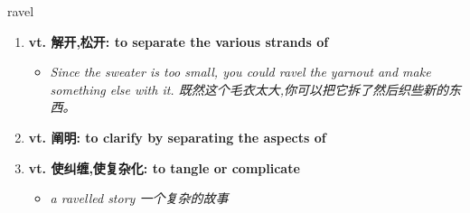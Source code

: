 
\begin{frame}
{\huge ravel}
\begin{center}
\begin{enumerate}\Large
  \item \textbf{vt. 解开,松开: to separate the various strands of}
  \begin{itemize}
    \item \em{\Large{Since the sweater is too small, you could ravel the yarnout and make something else with it. 既然这个毛衣太大,你可以把它拆了然后织些新的东西。}}
  \end{itemize}
  \item \textbf{vt. 阐明: to clarify by separating the aspects of}
  \item \textbf{vt. 使纠缠,使复杂化: to tangle or complicate}
  \begin{itemize}
    \item \em{\Large{a ravelled story 一个复杂的故事}}
  \end{itemize}
\end{enumerate}
\end{center}
\end{frame}
